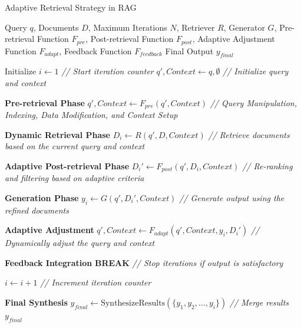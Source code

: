 \begin{algorithm}
	\caption{Adaptive Retrieval Strategy in RAG}
	\label{alg:adaptive_rag_workflow}
	\begin{algorithmic}[1]
		\REQUIRE Query $q$, Documents $D$, Maximum Iterations $N$, Retriever $R$, Generator $G$, Pre-retrieval Function $F_{pre}$, Post-retrieval Function $F_{post}$, Adaptive Adjustment Function $F_{adapt}$, Feedback Function $F_{feedback}$
		\ENSURE Final Output $y_{final}$
		
		\STATE Initialize $i \gets 1$ \hfill \textit{// Start iteration counter}
		\STATE $q', Context \gets q, \emptyset$ \hfill \textit{// Initialize query and context}
		
		
		\STATE \textbf{Pre-retrieval Phase}
		\STATE $q', Context \gets F_{pre}(q', Context)$ \hfill \textit{// Query Manipulation, Indexing, Data Modification, and Context Setup}
		
		\STATE \textbf{Dynamic Retrieval Phase}
		\STATE $D_{i} \gets R(q', D, Context)$ \hfill \textit{// Retrieve documents based on the current query and context}
		
		\STATE \textbf{Adaptive Post-retrieval Phase}
		\STATE $D_{i}' \gets F_{post}(q', D_{i}, Context)$ \hfill \textit{// Re-ranking and filtering based on adaptive criteria}
		
		\STATE \textbf{Generation Phase}
		\STATE $y_{i} \gets G(q', D_{i}', Context)$ \hfill \textit{// Generate output using the refined documents}
		
		\STATE \textbf{Adaptive Adjustment}
		\STATE $q', Context \gets F_{adapt}(q', Context, y_{i}, D_{i}')$ \hfill \textit{// Dynamically adjust the query and context}
		\ENDIF
		
		\STATE \textbf{Feedback Integration}
		\STATE \textbf{BREAK} \hfill \textit{// Stop iterations if output is satisfactory}
		\ENDIF
		
		\STATE $i \gets i + 1$ \hfill \textit{// Increment iteration counter}
		\ENDWHILE
		
		\STATE \textbf{Final Synthesis}
		\STATE $y_{final} \gets \text{SynthesizeResults}(\{y_{1}, y_{2}, \dots, y_{i}\})$ \hfill \textit{// Merge results}
		\RETURN $y_{final}$
		
	\end{algorithmic}
\end{algorithm}

